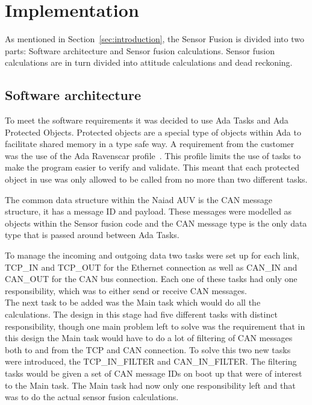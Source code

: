 \pagebreak
\section{Implementation}\label{sec:implementation}
As mentioned in Section~\ref{sec:introduction}, the Sensor Fusion is divided into two parts: Software architecture and Sensor fusion calculations. Sensor fusion calculations are in turn divided into attitude
calculations and dead reckoning.

\subsection{Software architecture}
To meet the software requirements it was decided to use Ada Tasks and Ada
Protected Objects. Protected objects are a special type of objects within Ada
to facilitate shared memory in a type safe way. A requirement from the
customer was the use of the Ada Ravenscar profile~\cite{web:ada-ravenscar-high-integrity}. This profile limits
the use of tasks to make the program easier to verify and validate. This meant
that each protected object in use was only allowed to be called from no more than two
different tasks.

The common data structure within the Naiad AUV is the CAN message structure,
it has a message ID and payload. These messages were modelled as objects within
the Sensor fusion code and the CAN message type is the only data type that
is passed around between Ada Tasks.

To manage the incoming and outgoing data two tasks were set up for each link,
TCP\_IN and TCP\_OUT for the Ethernet connection as well as CAN\_IN and CAN\_OUT for
the CAN bus connection. Each one of these tasks had only one responsibility, which
was to either send or receive CAN messages. \\
The next task to be added was the Main
task which would do all the calculations. The design in this stage had five
different tasks with distinct responsibility, though one main problem left to solve
was the requirement that in this design the Main task would have to do a lot of
filtering of CAN messages both to and from the TCP and CAN connection. To solve this
two new tasks were introduced, the TCP\_IN\_FILTER and CAN\_IN\_FILTER. The filtering
tasks would be given a set of CAN message IDs on boot up that were of interest to
the Main task. The Main task had now only one responsibility left and that was
to do the actual sensor fusion calculations.

